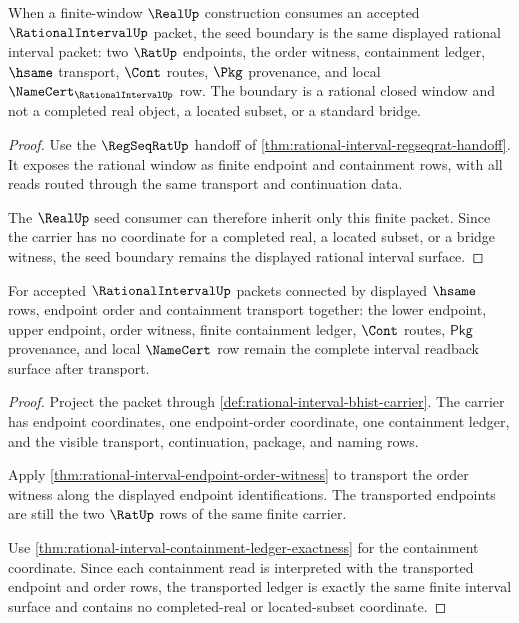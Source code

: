 \begin{theorem}
\label{thm:rational-interval-realup-seed-boundary}
When a finite-window $\RealUp$ construction consumes an accepted
$\RationalIntervalUp$ packet, the seed boundary is the same displayed rational
interval packet: two $\RatUp$ endpoints, the order witness, containment
ledger, $\hsame$ transport, $\Cont$ routes, $\Pkg$ provenance, and local
$\NameCert_{\RationalIntervalUp}$ row. The boundary is a rational closed
window and not a completed real object, a located subset, or a standard bridge.
\end{theorem}
\begin{proof}
Use the $\RegSeqRatUp$ handoff of
\autoref{thm:rational-interval-regseqrat-handoff}. It exposes the rational
window as finite endpoint and containment rows, with all reads routed through
the same transport and continuation data.

The $\RealUp$ seed consumer can therefore inherit only this finite packet.
Since the carrier has no coordinate for a completed real, a located subset,
or a bridge witness, the seed boundary remains the displayed rational
interval surface.
\end{proof}

\begin{theorem}
\label{thm:rational-interval-endpoint-containment-transport}
For accepted $\RationalIntervalUp$ packets connected by displayed $\hsame$
rows, endpoint order and containment transport together: the lower endpoint,
upper endpoint, order witness, finite containment ledger, $\Cont$ routes,
$\mathsf{Pkg}$ provenance, and local $\NameCert$ row remain the complete
interval readback surface after transport.
\end{theorem}
\begin{proof}
Project the packet through
\autoref{def:rational-interval-bhist-carrier}. The carrier has endpoint
coordinates, one endpoint-order coordinate, one containment ledger, and the
visible transport, continuation, package, and naming rows.

Apply \autoref{thm:rational-interval-endpoint-order-witness} to transport the
order witness along the displayed endpoint identifications. The transported
endpoints are still the two $\RatUp$ rows of the same finite carrier.

Use \autoref{thm:rational-interval-containment-ledger-exactness} for the
containment coordinate. Since each containment read is interpreted with the
transported endpoint and order rows, the transported ledger is exactly the
same finite interval surface and contains no completed-real or located-subset
coordinate.
\end{proof}

